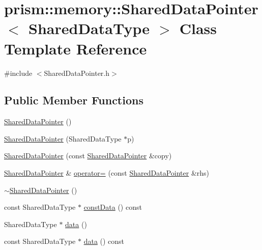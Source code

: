 \hypertarget{classprism_1_1memory_1_1_shared_data_pointer}{}\section{prism\+:\+:memory\+:\+:Shared\+Data\+Pointer$<$ Shared\+Data\+Type $>$ Class Template Reference}
\label{classprism_1_1memory_1_1_shared_data_pointer}


{\ttfamily \#include $<$Shared\+Data\+Pointer.\+h$>$}

\subsection*{Public Member Functions}
\begin{DoxyCompactItemize}
\item 
\hyperlink{classprism_1_1memory_1_1_shared_data_pointer_a4be66e91be3996b6785dd6b4587103dc}{Shared\+Data\+Pointer} ()
\item 
\hyperlink{classprism_1_1memory_1_1_shared_data_pointer_a91e65371f722c076c077d41092e54bb1}{Shared\+Data\+Pointer} (Shared\+Data\+Type $\ast$p)
\item 
\hyperlink{classprism_1_1memory_1_1_shared_data_pointer_a07819ac3e0d0c5e2b6adeb16c9943f26}{Shared\+Data\+Pointer} (const \hyperlink{classprism_1_1memory_1_1_shared_data_pointer}{Shared\+Data\+Pointer} \&copy)
\item 
\hyperlink{classprism_1_1memory_1_1_shared_data_pointer}{Shared\+Data\+Pointer} \& \hyperlink{classprism_1_1memory_1_1_shared_data_pointer_a5c82d7c3cb1d102108b05d00d4bf6f12}{operator=} (const \hyperlink{classprism_1_1memory_1_1_shared_data_pointer}{Shared\+Data\+Pointer} \&rhs)
\item 
\hyperlink{classprism_1_1memory_1_1_shared_data_pointer_a3520c2c51a47ae016a2376a358263287}{$\sim$\+Shared\+Data\+Pointer} ()
\item 
const Shared\+Data\+Type $\ast$ \hyperlink{classprism_1_1memory_1_1_shared_data_pointer_acf60fd3e1235f7243d0fb7d64baf8084}{const\+Data} () const 
\item 
Shared\+Data\+Type $\ast$ \hyperlink{classprism_1_1memory_1_1_shared_data_pointer_a8a94b4e03abe792472af878bdfc00711}{data} ()
\item 
const Shared\+Data\+Type $\ast$ \hyperlink{classprism_1_1memory_1_1_shared_data_pointer_addecd32c104c87376237ab2b70274d0a}{data} () const 
\item 

\end{DoxyCompactItemize}
